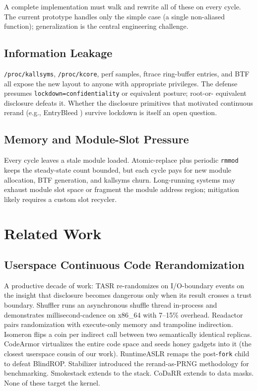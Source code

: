 \documentclass[10pt,letterpaper]{article}
\begin{document}
A complete implementation must walk and rewrite all of these on every
cycle. The current prototype handles only the simple case (a single
non-aliased function); generalization is the central engineering
challenge.

\subsection{Information Leakage}

\texttt{/proc/kallsyms}, \texttt{/proc/kcore}, perf samples, ftrace
ring-buffer entries, and BTF all expose the new layout to anyone
with appropriate privileges. The defense presumes
\texttt{lockdown=confidentiality} or equivalent posture; root-or-
equivalent disclosure defeats it. Whether the disclosure primitives
that motivated continuous rerand (e.g., EntryBleed
\cite{entrybleed}) survive lockdown is itself an open question.

\subsection{Memory and Module-Slot Pressure}

Every cycle leaves a stale module loaded. Atomic-replace plus
periodic \texttt{rmmod} keeps the steady-state count bounded, but
each cycle pays for new module allocation, BTF generation, and
kallsyms churn. Long-running systems may exhaust module slot space
or fragment the module address region; mitigation likely requires a
custom slot recycler.

\section{Related Work}
\label{sec:related}

\subsection{Userspace Continuous Code Rerandomization}

A productive decade of work: TASR \cite{tasr} re-randomizes on
I/O-boundary events on the insight that disclosure becomes dangerous
only when its result crosses a trust boundary. Shuffler \cite{shuffler}
runs an asynchronous shuffle thread in-process and demonstrates
millisecond-cadence on x86\_64 with 7--15\% overhead. Readactor
\cite{readactor} pairs randomization with execute-only memory and
trampoline indirection. Isomeron \cite{isomeron} flips a coin per
indirect call between two semantically identical replicas. CodeArmor
\cite{codearmor} virtualizes the entire code space and seeds honey
gadgets into it (the closest userspace cousin of our work). RuntimeASLR
\cite{runtimeaslr} remaps the post-\texttt{fork} child to defeat
BlindROP. Stabilizer \cite{stabilizer} introduced the rerand-as-PRNG
methodology for benchmarking. Smokestack \cite{smokestack} extends to
the stack. CoDaRR \cite{codarr} extends to data masks. None of these
target the kernel.
\end{document}
